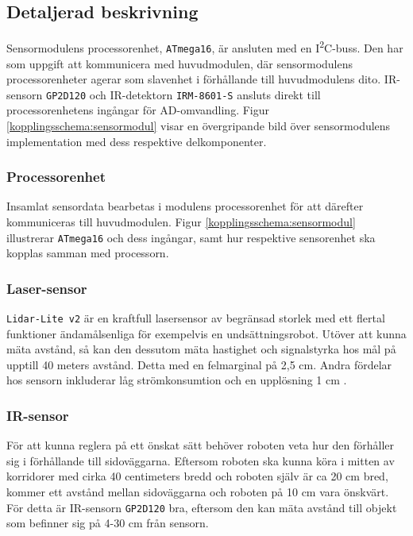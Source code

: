 \documentclass[11pt]{article}
\begin{document}
\begin{flushleft}
\begin{itemize}
\end{itemize}

\subsection{Detaljerad beskrivning}

Sensormodulens processorenhet, \verb+ATmega16+, är ansluten med en I\textsuperscript{2}C-buss. Den har som uppgift att kommunicera med huvudmodulen, där sensormodulens processorenheter agerar som slavenhet i förhållande till huvudmodulens dito. 
IR-sensorn \verb+GP2D120+ och IR-detektorn \verb+IRM-8601-S+ ansluts direkt till processorenhetens ingångar för AD-omvandling. Figur \ref{kopplingsschema:sensormodul} visar en övergripande bild över sensormodulens implementation med dess respektive delkomponenter. 

\subsubsection{Processorenhet}
Insamlat sensordata bearbetas i modulens processorenhet för att därefter kommuniceras till huvudmodulen. Figur \ref{kopplingsschema:sensormodul} illustrerar \verb+ATmega16+ och dess ingångar, samt hur respektive sensorenhet ska kopplas samman med processorn. 

\subsubsection{Laser-sensor}
\verb+Lidar-Lite v2+ är en kraftfull lasersensor av begränsad storlek med ett flertal funktioner ändamålsenliga för exempelvis en undsättningsrobot. Utöver att kunna mäta avstånd, så kan den dessutom mäta hastighet och signalstyrka hos mål på upptill 40 meters avstånd. Detta med en felmarginal på 2,5 cm. Andra fördelar hos sensorn inkluderar låg strömkonsumtion och en upplösning 1 cm \cite{7131685}.


\subsubsection{IR-sensor}
För att kunna reglera på ett önskat sätt behöver roboten veta hur den förhåller sig i förhållande till sidoväggarna. Eftersom roboten ska kunna köra i mitten av korridorer med cirka 40 centimeters bredd och roboten själv är ca 20 cm bred, kommer ett avstånd mellan sidoväggarna och roboten på 10 cm vara önskvärt. För detta är IR-sensorn \verb+GP2D120+ bra, eftersom den kan mäta avstånd till objekt som befinner sig på 4-30 cm från sensorn. 


\end{flushleft}
\end{document}
